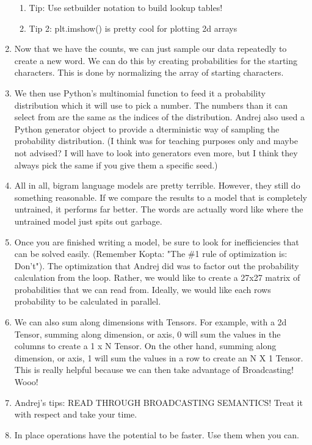\documentclass[a4paper, 11pt, oneside]{researchjournal} %
\begin{document}
\begin{enumerate}
\begin{enumerate}
        \item Tip: Use setbuilder notation to build lookup tables! 
        \item Tip 2: plt.imshow() is pretty cool for plotting 2d arrays
    \end{enumerate}
    \item Now that we have the counts, we can just sample our data repeatedly to create a new word. We can do this by creating probabilities for the starting characters. This is done by normalizing the array of starting characters. 
    \item We then use Python's multinomial function to feed it a probability distribution which it will use to pick a number. The numbers than it can select from are the same as the indices of the distribution. Andrej also used a Python generator object to provide a dterministic way of sampling the probability distribution. (I think was for teaching purposes only and maybe not advised? I will have to look into generators even more, but I think they always pick the same if you give them a specific seed.) 
    \item All in all, bigram language models are pretty terrible. However, they still do something reasonable. If we compare the results to a model that is completely untrained, it performs far better. The words are actually word like where the untrained model just spits out garbage. 
    \item Once you are finished writing a model, be sure to look for inefficiencies that can be solved easily. (Remember Kopta: "The \#1 rule of optimization is: Don't"). The optimization that Andrej did was to factor out the probability calculation from the loop. Rather, we would like to create a 27x27 matrix of probabilities that we can read from. Ideally, we would like each rows probability to be calculated in parallel. 
    \item We can also sum along dimensions with Tensors. For example, with a 2d Tensor, summing along dimension, or axis, 0 will sum the values in the columns to create a 1 x N Tensor. On the other hand, summing along dimension, or axis, 1 will sum the values in a row to create an N X 1 Tensor. This is really helpful because we can then take advantage of Broadcasting! Wooo!
    \item Andrej's tips: READ THROUGH BROADCASTING SEMANTICS! Treat it with respect and take your time. 
    \item In place operations have the potential to be faster. Use them when you can.
\end{enumerate}
\end{document}
